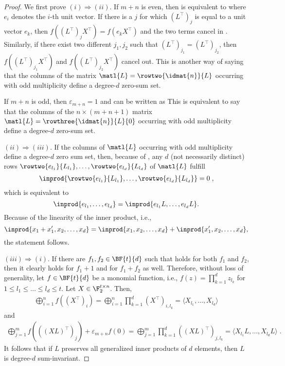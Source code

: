 \begin{proof}

We first prove $(i) \Rightarrow (ii)$.
If $m+n$ is even, then  is equivalent to 
where $e_i$ denotes the $i$-th unit vector. If there is a $j$ for which $(L^\top)_j$ is equal to a unit vector $e_k$, then $f((L^\top)_j X^\top) = f(e_k X^\top)$ and the two terms cancel in . Similarly, if there exist two different $j_1,j_2$ such that $(L^\top)_{j_1} = (L^\top)_{j_2}$, then $f( (L^\top)_{j_1} X^\top)$ and  $f( (L^\top)_{j_2}X^\top)$ cancel out. This is another way of saying that the columns of the matrix $\matl{L} = \rowtwo{\idmat{n}}{L}$ occurring with odd multiplicity define a degree-$d$ zero-sum set.

If $m+n$ is odd, then $\varepsilon_{m+n} = 1$ and  can be written as
This is equivalent to say that the columns of the $n\times(m+n+1)$ matrix $\matl{L} = \rowthree{\idmat{n}}{L}{0}$ occurring with odd multiplicity define a degree-$d$ zero-sum set.


$(ii) \Rightarrow (iii)$. If the columns of $\matl{L}$ occurring with odd multiplicity define a degree-$d$ zero sum set, then, because of , any $d$ (not necessarily distinct) rows $\rowtwo{e_{l_1}}{L_{l_1}},\ldots,\rowtwo{e_{l_d}}{L_{l_d}}$ of $\matl{L}$ fulfill 
\begin{align*}
    \inprod{ \rowtwo{e_{l_1}}{L_{l_1}}, \ldots, \rowtwo{e_{l_d}}{L_{l_d}} } = 0\;, 
\end{align*}
which is equivalent to
$$
\inprod{e_{l_1},\dots,e_{l_d}} = \inprod{ e_{l_1}L,\dots,e_{l_d}L }.
$$
Because of the linearity of the inner product, i.e.,
$$
\inprod{x_1+x_1',x_2,\dots,x_d} = \inprod{x_1,x_2,\dots,x_d} + 
                                  \inprod{x_1',x_2,\dots,x_d},
$$
the statement follows.

$(iii) \Rightarrow (i)$. If there are $f_1,f_2 \in \BF{t}{d}$ such that  holds for both $f_1$ and $f_2$, then it clearly holds for $f_1+1$ and for $f_1+f_2$ as well. Therefore, without loss of generality, let $f \in \BF{t}{d}$ be a monomial function, i.e., $f(z) = \prod_{k=1}^{d}z_{l_k}$ for $1 \leq l_1 \leq \dots \leq l_{d} \leq t$. Let $X \in \F_2^{t \times n}$. Then,
\begin{align*}
    \bigoplus_{i=1}^n f((X^\top)_i) =
    \bigoplus_{i=1}^n\prod_{k=1}^d (X^\top)_{i,l_k} =
    \langle X_{l_1},\dots,X_{l_d} \rangle 
\end{align*}
and
\begin{align*}
    \bigoplus_{j=1}^m f( ((XL)^\top)_j) + \varepsilon_{m+n}f(0) = 
    \bigoplus_{j=1}^m\prod_{k=1}^d ((XL)^\top)_{j,l_k} = \langle X_{l_1}L,\dots,X_{l_d}L \rangle \;.
\end{align*}
It follows that if $L$ preserves all generalized inner products of $d$ elements, then $L$ is degree-$d$ sum-invariant.


\end{proof}
